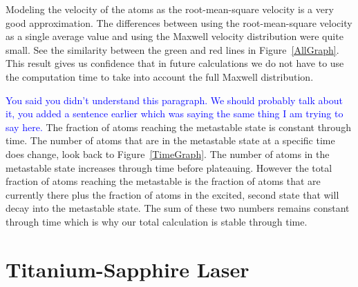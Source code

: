 \documentclass[prb,preprint]{revtex4-1}
\begin{document}
Modeling the velocity of the atoms as the root-mean-square velocity is a very good approximation. The differences between using the root-mean-square velocity as a single average value and using the Maxwell velocity distribution were quite small. See the similarity between the green and red lines in Figure~\ref{AllGraph}.  This result gives us confidence that in future calculations we do not have to use the computation time to take into account the full Maxwell distribution.

\textcolor{blue}{You said you didn't understand this paragraph. We should probably talk about it, you added a sentence earlier which was saying the same thing I am trying to say here.}
The fraction of atoms reaching the metastable state is constant through time. The number of atoms that are in the metastable state at a specific time does change, look back to Figure~\ref{TimeGraph}. The number of atoms in the metastable state increases through time before plateauing. However the total fraction of atoms reaching the metastable is the fraction of atoms that are currently there plus the fraction of atoms in the excited, second state that will decay into the metastable state. The sum of these two numbers remains constant through time which is why our total calculation is stable through time.
  

\section{Titanium-Sapphire Laser}
\end{document}
